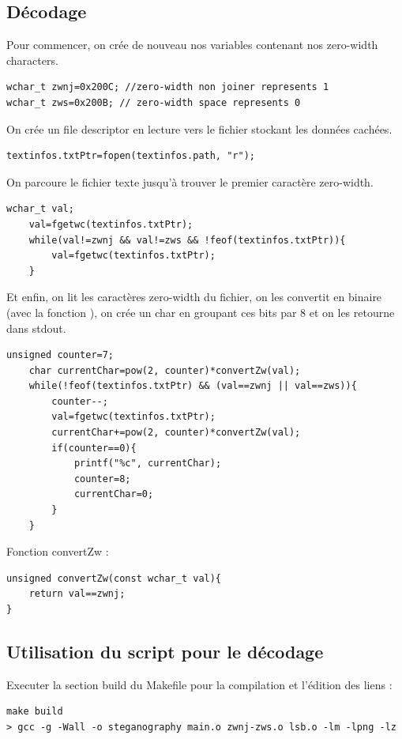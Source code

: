 \subsection{Décodage}
Pour commencer, on crée de nouveau nos variables contenant nos zero-width characters.
\newline
\begin{lstlisting}
wchar_t zwnj=0x200C; //zero-width non joiner represents 1
wchar_t zws=0x200B; // zero-width space represents 0
\end{lstlisting}
On crée un file descriptor en lecture vers le fichier stockant les données cachées.
\newline
\begin{lstlisting}
textinfos.txtPtr=fopen(textinfos.path, "r");
\end{lstlisting}
On parcoure le fichier texte jusqu'à trouver le premier caractère zero-width.
\begin{lstlisting}
wchar_t val;
    val=fgetwc(textinfos.txtPtr);
    while(val!=zwnj && val!=zws && !feof(textinfos.txtPtr)){
        val=fgetwc(textinfos.txtPtr);
    }
\end{lstlisting}
Et enfin, on lit les caractères zero-width du fichier, on les convertit en binaire (avec la fonction ), on crée un char en groupant ces bits par 8 et on les retourne dans stdout.
\begin{lstlisting}
unsigned counter=7;
    char currentChar=pow(2, counter)*convertZw(val);
    while(!feof(textinfos.txtPtr) && (val==zwnj || val==zws)){
        counter--;
        val=fgetwc(textinfos.txtPtr);
        currentChar+=pow(2, counter)*convertZw(val);
        if(counter==0){
            printf("%c", currentChar);
            counter=8;
            currentChar=0;
        }
    }
\end{lstlisting}

Fonction convertZw :
\begin{lstlisting}
unsigned convertZw(const wchar_t val){
    return val==zwnj;
}
\end{lstlisting}

\subsection{Utilisation du script pour le décodage}
Executer la section build du Makefile pour la compilation et l'édition des liens :
\begin{lstlisting}
make build
> gcc -g -Wall -o steganography main.o zwnj-zws.o lsb.o -lm -lpng -lz
\end{lstlisting}

